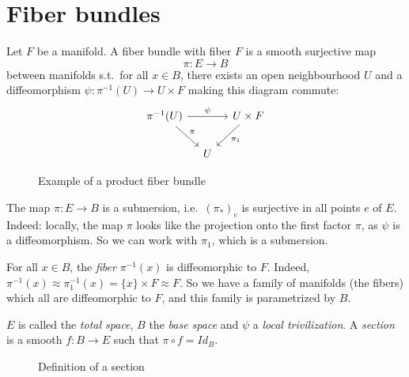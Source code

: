 \section{Fiber bundles}

\begin{definition}
    Let $F$ be a manifold.
    A fiber bundle with fiber $F$ is a smooth surjective map $$\pi: E \to  B$$ between manifolds s.t.\ for all $x \in B$, there exists an open neighbourhood $U$ and a diffeomorphism $\psi: \pi^{-1}(U) \to  U \times F$ making this diagram commute:
    \[
        \begin{tikzcd}[ column sep=1em ]
          \pi^{-1}(U) \arrow[rr, "\psi"] \arrow[dr, "\pi"]& &U \times F \arrow[dl, "\pi_1"]\\
                                                     & U &
        \end{tikzcd}
    \]
\end{definition}

\begin{figure}[H]
    \centering
    \caption{Example of a product fiber bundle}
    \label{fig:example-of-fiber-bundle}
\end{figure}



\begin{remark}
    The map $\pi: E \to  B$ is a submersion, i.e.\ $(\pi_*)_e$ is surjective in all points $e$ of $E$.
    Indeed: locally, the map $\pi$ looks like the projection onto the first factor $\pi$, as $\psi$ is a diffeomorphism.
    So we can work with $\pi_1$, which is a submersion.
\end{remark}
\begin{remark}
    For all $x \in B$, the \emph{fiber}  $\pi^{-1}(x)$ is diffeomorphic to $F$.
    Indeed, $\pi^{-1}(x) \approx \pi_1^{-1}(x) = \{x\} \times F \approx F$.
    So we have a family of manifolds (the fibers) which all are diffeomorphic to $F$, and this family is parametrized by $B$.

$E$ is called the \emph{total space}, $B$ the \emph{base space} and $\psi$ a \emph{local trivilization}.
A \emph{section} is a smooth  $f: B \to  E$ such that $\pi  \circ  f = Id_B$.
\end{remark}

\begin{figure}[H]
    \centering
    \caption{Definition of a section}
    \label{fig:definition-of-a-section}
\end{figure}

